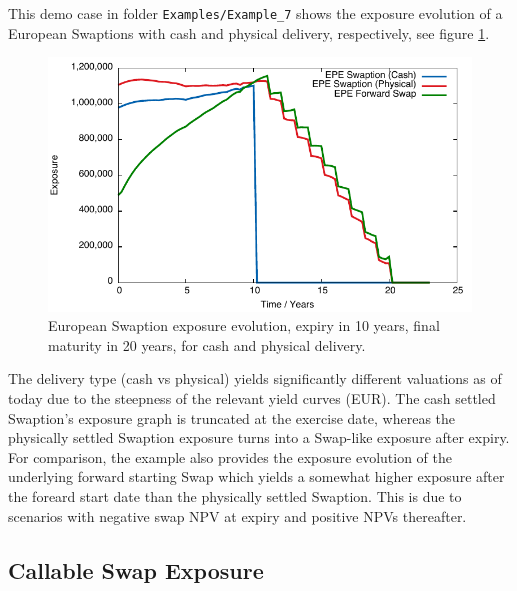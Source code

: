 \documentclass[12pt, a4paper]{article}
\begin{document}
This demo case in folder {\tt Examples/Example\_7} shows the exposure evolution of a European Swaptions with cash and physical delivery, respectively, see figure \ref{fig_3}.
\begin{figure}[hbt]
\begin{center}
\includegraphics[scale=1.0]{example_swaption.pdf}
\end{center}
\caption{European Swaption exposure evolution, expiry in 10 years, final maturity in 20 years, for cash and physical delivery.}
\label{fig_3}
\end{figure}
The delivery type (cash vs physical) yields significantly different valuations as of today due to the steepness of the relevant yield curves (EUR). The cash settled Swaption's exposure graph is truncated at the exercise date, whereas the physically settled Swaption exposure turns into a Swap-like exposure after expiry. For comparison, the example also provides the exposure evolution of the underlying forward starting Swap which yields a somewhat higher exposure after the foreard start date than the physically settled Swaption. This is due to scenarios with negative swap NPV at expiry and positive NPVs thereafter.


\subsection{Callable Swap Exposure}
\end{document}
